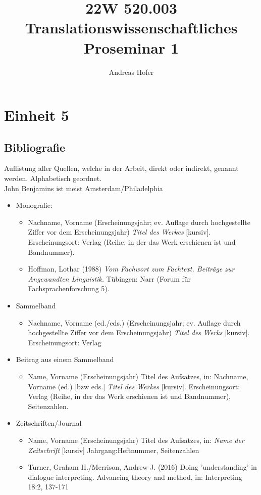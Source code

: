 \documentclass{article}
\title{\vspace{-3cm}22W 520.003 Translationswissenschaftliches Proseminar 1}
\author{Andreas Hofer}
\begin{document}
	\section{Einheit 5}
	\subsection{Bibliografie}
	Auflistung aller Quellen, welche in der Arbeit, direkt oder indirekt, genannt werden. Alphabetisch geordnet. \\
	John Benjamins ist meist Amsterdam/Philadelphia
	\begin{itemize}
		\item{Monografie:}
		\begin{itemize}
			\item{Nachname, Vorname (Erscheinungsjahr; ev. Auflage durch hochgestellte Ziffer vor dem Erscheinungsjahr) \textit{Titel des Werkes} [kursiv]. Erscheinungsort: Verlag (Reihe, in der das Werk erschienen ist und Bandnummer).}
			\item{Hoffman, Lothar (1988) \textit{Vom Fachwort zum Fachtext. Beiträge zur Angewandten Linguistik.} Tübingen: Narr (Forum für Fachsprachenforschung 5).}
		\end{itemize}
		\item{Sammelband}
		\begin{itemize}
			\item{Nachname, Vorname (ed./eds.) (Erscheinungsjahr; ev. Auflage durch hochgestellte Ziffer vor dem Erscheinungsjahr) \textit{Titel des Werks} [kursiv]. Erscheinungsort: Verlag}
		\end{itemize}
		\item{Beitrag aus einem Sammelband}
		\begin{itemize}
			\item{Name, Vorname (Erscheinungsjahr) \glqq Titel des Aufsatzes\grqq [in Anführungszeichen], in: Nachname, Vorname (ed.) [bzw eds.] \textit{Titel des Werkes} [kursiv]. Erscheinungsort: Verlag (Reihe, in der das Werk erschienen ist und Bandnummer), Seitenzahlen.}
		\end{itemize}
		\item{Zeitschriften/Journal}
		\begin{itemize}
			\item{Name, Vorname (Erscheinungsjahr) \glqq Titel des Aufsatzes\grqq [in Anführungszeichen], in: \textit{Name der Zeitschrift} [kursiv] Jahrgang:Heftnummer, Seitenzahlen}
			\item{Turner, Graham H./Merrison, Andrew J. (2016) \glqq Doing 'understanding' in dialogue interpreting. Advancing theory and method\grqq , in: Interpreting 18:2, 137-171}

\end{itemize}
\end{itemize}
\end{document}
